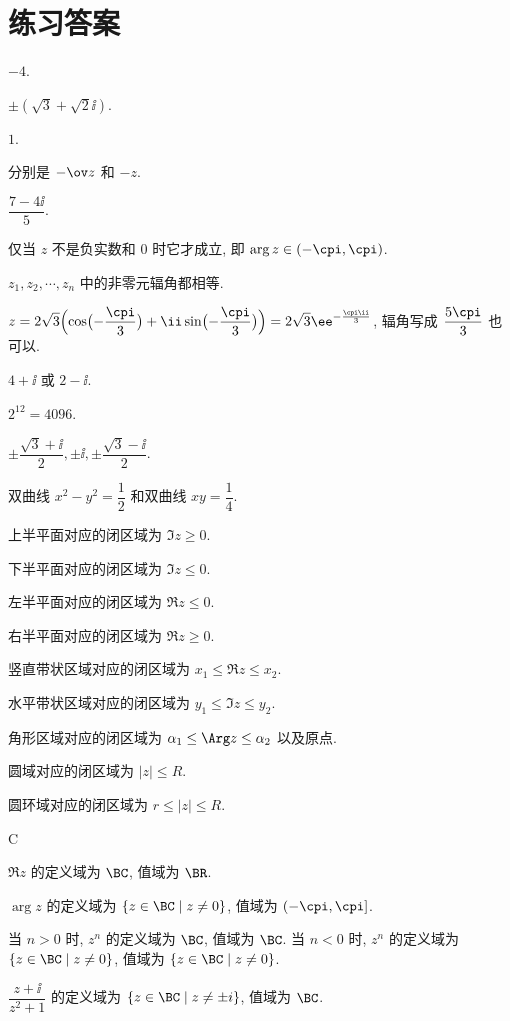 \chapter{练习答案}

\setcounter{chapter}{0}
\setcounter{exer}{0}

\exans $-4$.

\exans $\pm(\sqrt3+\sqrt2\ii)$.

\exans $1$.

\exans 分别是 $-\ov z$ 和 $-z$.

\exans $\dfrac{7-4\ii}5$.

\exans 仅当 $z$ 不是负实数和 $0$ 时它才成立, 即 $\arg z\in(-\cpi,\cpi)$.

\exans $z_1,z_2,\cdots,z_n$ 中的非零元辐角都相等.

\exans $\displaystyle z=2\sqrt3\Bigl(\cos\bigl(-\frac\cpi3\bigr)+\ii\sin\bigl(-\frac\cpi3\bigr)\Bigr)=2\sqrt3\ee^{-\frac{\cpi\ii}3}$, 辐角写成 $\dfrac{5\cpi}3$ 也可以.

\exans $4+\ii$ 或 $2-\ii$.

\exans $2^{12}=4096$.

\exans $\pm\dfrac{\sqrt3+\ii}2,\pm \ii,\pm\dfrac{\sqrt3-\ii}2$.

\exans 双曲线 $x^2-y^2=\dfrac12$ 和双曲线 $xy=\dfrac14$.

\exans \delspace
\begin{enumnopar}[(i)]
  \item 上半平面对应的闭区域为 $\Im z\ge0$.
  \item 下半平面对应的闭区域为 $\Im z\le0$.
  \item 左半平面对应的闭区域为 $\Re z\le0$.
  \item 右半平面对应的闭区域为 $\Re z\ge0$.
  \item 竖直带状区域对应的闭区域为 $x_1\le\Re z\le x_2$.
  \item 水平带状区域对应的闭区域为 $y_1\le\Im z\le y_2$.
  \item 角形区域对应的闭区域为 $\alpha_1\le \Arg z\le \alpha_2$ 以及原点.
  \item 圆域对应的闭区域为 $|z|\le R$.
  \item 圆环域对应的闭区域为 $r\le|z|\le R$.
\end{enumnopar}

\exans C

\exans \delspace
\begin{enumnopar}[(i)]
  \item $\Re z$ 的定义域为 $\BC$, 值域为 $\BR$.
  \item $\arg z$ 的定义域为 $\{z\in\BC\mid z\neq 0\}$, 值域为 $(-\cpi,\cpi]$.
  \item 当 $n>0$ 时, $z^n$ 的定义域为 $\BC$, 值域为 $\BC$.
  当 $n<0$ 时, $z^n$ 的定义域为 $\{z\in\BC\mid z\neq 0\}$, 值域为 $\{z\in\BC\mid z\neq 0\}$.
  \item $\dfrac{z+\ii}{z^2+1}$ 的定义域为 $\{z\in\BC\mid z\neq \pm i\}$, 值域为 $\BC$.
\end{enumnopar}

